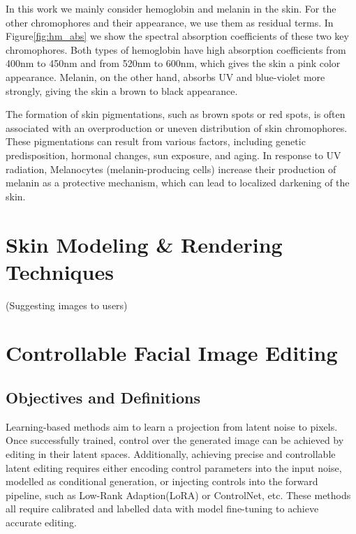 \begin{spacing}{1.5}
In this work we mainly consider hemoglobin and melanin in the skin. For the other chromophores and their appearance, we use them as residual terms. In Figure\ref{fig:hm_abs} we show the spectral absorption coefficients of these two key chromophores. Both types of hemoglobin have high absorption coefficients from 400nm to 450nm and from 520nm to 600nm, which gives the skin a pink color appearance. Melanin, on the other hand, absorbs UV and blue-violet more strongly, giving the skin a brown to black appearance.

The formation of skin pigmentations, such as brown spots or red spots, is often associated with an overproduction or uneven distribution of skin chromophores. These pigmentations can result from various factors, including genetic predisposition, hormonal changes, sun exposure, and aging. In response to UV radiation, Melanocytes (melanin-producing cells) increase their production of melanin as a protective mechanism, which can lead to localized darkening of the skin.

\section{Skin Modeling \& Rendering Techniques}
(Suggesting images to users)

\section{Controllable Facial Image Editing}


\subsection{Objectives and Definitions}

Learning-based methods aim to learn a projection from latent noise to pixels\cite{goodfellowGenerativeAdversarialNetworks2014,DBLP:conf/nips/HoJA20,DBLP:journals/corr/KingmaW13}. Once successfully trained, control over the generated image can be achieved by editing in their latent spaces\cite{DBLP:journals/corr/abs-1812-04948, DBLP:journals/corr/abs-1907-10786}. Additionally, achieving precise and controllable latent editing requires either encoding control parameters into the input noise, modelled as conditional generation\cite{isolaImagetoimageTranslationConditional2017}, or injecting controls into the forward pipeline, such as Low-Rank Adaption(LoRA)\cite{2021arXiv210609685H} or ControlNet\cite{2023arXiv230205543Z}, etc. These methods all require calibrated and labelled data with model fine-tuning to achieve accurate editing.


\end{spacing}
